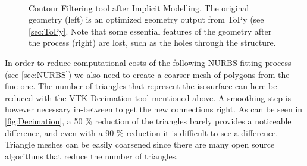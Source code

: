\begin{figure}
\centering
   \\
   \caption{Contour Filtering tool after Implicit Modelling. The original geometry (left) is an optimized geometry output from ToPy (see \autoref{sec:ToPy}. Note that some essential features of the geometry after the process (right) are lost, such as the holes through the structure.}
   \label{fig:contouring}
\end{figure}



In order to reduce computational costs of the following NURBS fitting process (see \autoref{sec:NURBS}) we also need to create a coarser mesh of polygons from the fine one. The number of triangles that represent the
isosurface can here be reduced with the VTK Decimation tool mentioned above. A smoothing step is however necessary in-between
to get the new connections right. As can be seen in \autoref{fig:Decimation}, a 50 \% reduction of the
triangles barely provides a noticeable difference, and even with a 90 \% reduction it is difficult to see a difference. Triangle meshes can be easily coarsened since there are many open source algorithms that reduce the number of triangles. %

